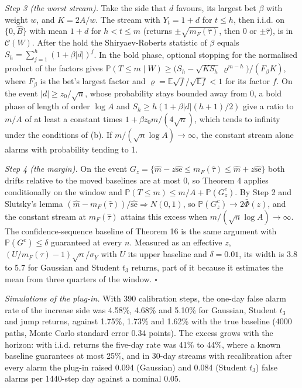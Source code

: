 \documentclass[
]{article}
\begin{document}
\emph{Step 3 (the worst stream).} Take the side that \(d\) favours, its
largest bet \(\beta\) with weight \(w\), and \(K = 2A/w\). The stream
with \(Y_t = 1 + d\) for \(t \le h\), then i.i.d. on
\(\lbrace 0, \hat B\rbrace\) with mean \(1 + d\) for \(h < t \le m\)
(returns \(\pm\sqrt{m_F(\hat\tau)}\), then 0 or \(\pm\hat\tau\)), is in
\(\mathcal{C}(W)\). After the hold the Shiryaev-Roberts statistic of
\(\beta\) equals \(S_h = \sum_{j=1}^{h}(1 + \beta\lvert d\rvert)^j\). In
the bold phase, optional stopping for the normalised product of the
factors gives
\(\mathbb{P}(T \le m \mid W) \ge \big(S_h - \sqrt{K S_h}\,\varrho^{m-h}\big)/(F_\beta K)\),
where \(F_\beta\) is the bet's largest factor and
\(\varrho = \mathbb{E}\sqrt f/\sqrt{\mathbb{E}f} < 1\) for its factor
\(f\). On the event \(\lvert d\rvert \ge z_0/\sqrt n\), whose
probability stays bounded away from 0, a bold phase of length of order
\(\log A\) and \(S_h \ge h(1 + \beta\lvert d\rvert(h+1)/2)\) give a
ratio to \(m/A\) of at least a constant times
\(1 + \beta z_0 m/(4\sqrt n)\), which tends to infinity under the
conditions of (b). If \(m/(\sqrt n\log A) \to \infty\), the constant
stream alone alarms with probability tending to 1.

\emph{Step 4 (the margin).} On the event
\(G_z = \lbrace \hat m - z\widehat{\mathrm{se}} \le m_F(\hat\tau) \le \hat m + z\widehat{\mathrm{se}}\rbrace\)
both drifts relative to the moved baselines are at most 0, so Theorem 4
applies conditionally on the window and
\(\mathbb{P}(T \le m) \le m/A + \mathbb{P}(G_z^c)\). By Step 2 and
Slutsky's lemma
\((\hat m - m_F(\hat\tau))/\widehat{\mathrm{se}} \Rightarrow N(0, 1)\),
so \(\mathbb{P}(G_z^c) \to 2\bar\Phi(z)\), and the constant stream at
\(m_F(\hat\tau)\) attains this excess when
\(m/(\sqrt n\log A) \to \infty\). The confidence-sequence baseline of
Theorem 16 is the same argument with \(\mathbb{P}(G^c) \le \delta\)
guaranteed at every \(n\). Measured as an effective \(z\),
\((U/m_F(\tau) - 1)\sqrt n/\sigma_Y\) with \(U\) its upper baseline and
\(\delta = 0.01\), its width is 3.8 to 5.7 for Gaussian and Student
\(t_3\) returns, part of it because it estimates the mean from three
quarters of the window. \(\square\)

\emph{Simulations of the plug-in.} With 390 calibration steps, the
one-day false alarm rate of the increase side was 4.58\%, 4.68\% and
5.10\% for Gaussian, Student \(t_3\) and jump returns, against 1.75\%,
1.73\% and 1.62\% with the true baseline (4000 paths, Monte Carlo
standard error 0.34 points). The excess grows with the horizon: with
i.i.d. returns the five-day rate was 41\% to 44\%, where a known
baseline guarantees at most 25\%, and in 30-day streams with
recalibration after every alarm the plug-in raised 0.094 (Gaussian) and
0.084 (Student \(t_3\)) false alarms per 1440-step day against a nominal
0.05.
\end{document}
